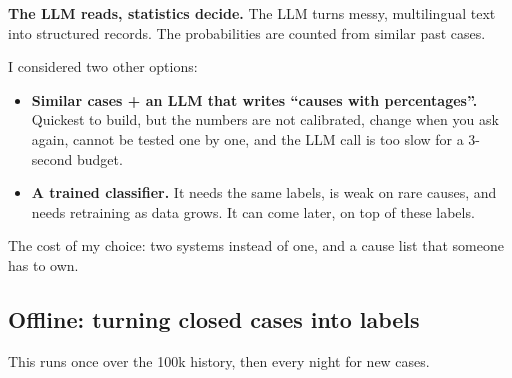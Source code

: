 \documentclass[11pt,a4paper]{article}
\begin{document}
\textbf{The LLM reads, statistics decide.} The LLM turns messy, multilingual text into structured records. The probabilities are counted from similar past cases.

I considered two other options:
\begin{itemize}
  \item \textbf{Similar cases + an LLM that writes “causes with percentages”.} Quickest to build, but the numbers are not calibrated, change when you ask again, cannot be tested one by one, and the LLM call is too slow for a 3-second budget.
  \item \textbf{A trained classifier.} It needs the same labels, is weak on rare causes, and needs retraining as data grows. It can come later, on top of these labels.
\end{itemize}
The cost of my choice: two systems instead of one, and a cause list that someone has to own.

\subsection{Offline: turning closed cases into labels}\label{sec:offline}

This runs once over the 100k history, then every night for new cases.
\end{document}
